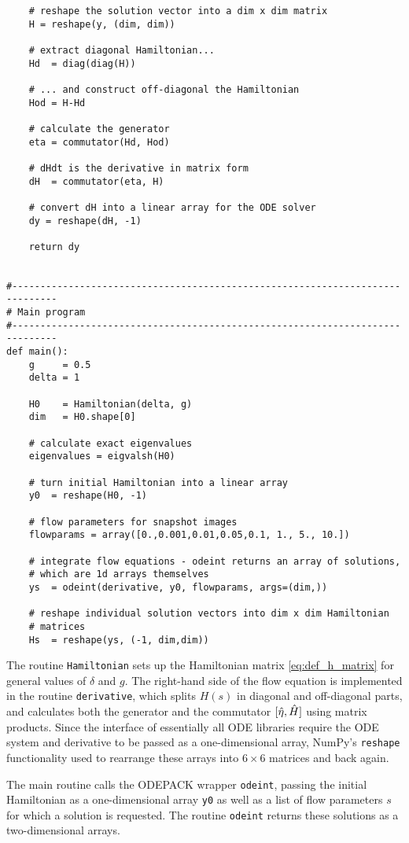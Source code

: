 {\begin{lstlisting}
    # reshape the solution vector into a dim x dim matrix
    H = reshape(y, (dim, dim))

    # extract diagonal Hamiltonian...
    Hd  = diag(diag(H))

    # ... and construct off-diagonal the Hamiltonian
    Hod = H-Hd

    # calculate the generator
    eta = commutator(Hd, Hod)

    # dHdt is the derivative in matrix form 
    dH  = commutator(eta, H)

    # convert dH into a linear array for the ODE solver
    dy = reshape(dH, -1)
      
    return dy


#------------------------------------------------------------------------------
# Main program
#------------------------------------------------------------------------------
def main():
    g     = 0.5
    delta = 1

    H0    = Hamiltonian(delta, g)
    dim   = H0.shape[0]

    # calculate exact eigenvalues
    eigenvalues = eigvalsh(H0)

    # turn initial Hamiltonian into a linear array
    y0  = reshape(H0, -1)                 

    # flow parameters for snapshot images
    flowparams = array([0.,0.001,0.01,0.05,0.1, 1., 5., 10.])

    # integrate flow equations - odeint returns an array of solutions,
    # which are 1d arrays themselves
    ys  = odeint(derivative, y0, flowparams, args=(dim,))

    # reshape individual solution vectors into dim x dim Hamiltonian
    # matrices
    Hs  = reshape(ys, (-1, dim,dim))
\end{lstlisting}


The routine \texttt{Hamiltonian} sets up the Hamiltonian matrix \eqref{eq:def_h_matrix}
for general values of $\delta$ and $g$. The right-hand side of the flow equation
is implemented in the routine \texttt{derivative}, which splits $H(s)$
in diagonal and off-diagonal parts, and calculates both the generator and
the commutator $[{\hat{\eta}},{\hat{H}}]$ using matrix products. Since the
interface of essentially all ODE libraries require the ODE system and
derivative to be passed as a one-dimensional array, NumPy's \texttt{reshape}
functionality used to rearrange these arrays into $6\times 6$ matrices 
and back again.

The main routine calls the ODEPACK wrapper \texttt{odeint}, passing 
the initial Hamiltonian as a one-dimensional array \texttt{y0} as well
as a list of flow parameters $s$ for which a solution is requested. The 
routine \texttt{odeint} returns these solutions as a two-dimensional arrays.

}
